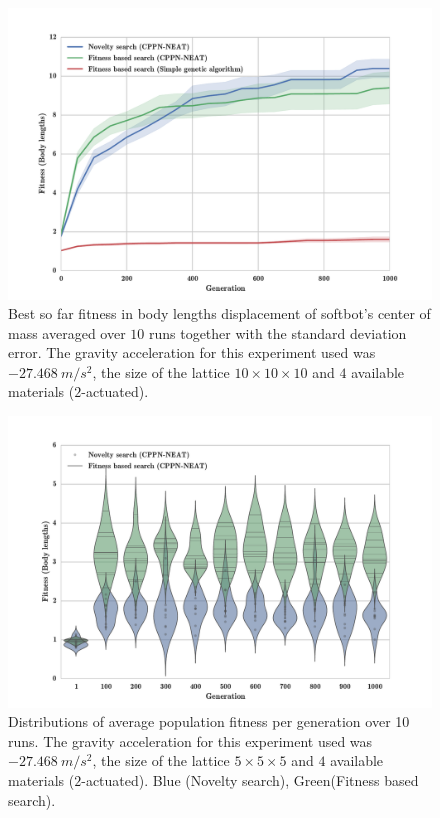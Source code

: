 \begin{figure}[h!]
\centering
\includegraphics[width=1.0\textwidth]{Figures/Results/FitvsNovVsDirSize10.pdf}
\caption{Best so far fitness in body lengths displacement of softbot's center of mass averaged over $10$ runs together with the standard deviation error. The gravity acceleration for this experiment used was $-27.468\   m/s^2$, the size of the lattice $10\times 10\times10$ and $4$ available materials ($2$-actuated).}
\label{fig:FitvsNovVsDirSize10}
\end{figure}

\begin{figure}
\centering
\includegraphics[width=1.0\textwidth]{Figures/Results/ViolinPlotsAvgGenFitSize5.pdf}
\caption{Distributions of average population fitness per generation over 10 runs. The gravity acceleration for this experiment used was $-27.468\   m/s^2$, the size of the lattice $5\times 5\times5$ and $4$ available materials ($2$-actuated). Blue (Novelty search), Green(Fitness based search).}
\label{fig:ViolinPlotsAvgGenFitSize5}
\end{figure}


